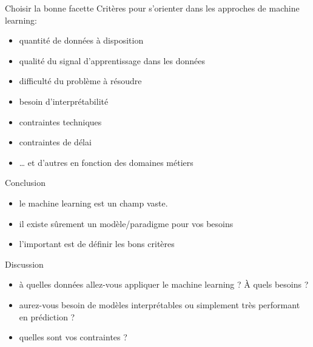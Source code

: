 \begin{frame}{Choisir la bonne facette}
  Critères pour s'orienter dans les approches de machine learning:
  \begin{itemize}[<+->]
  \item quantité de données à disposition
  \item qualité du signal d'apprentissage dans les données
  \item difficulté du problème à résoudre
  \item besoin d'interprétabilité
  \item contraintes techniques
  \item contraintes de délai
  \item … et d'autres en fonction des domaines métiers
  \end{itemize}
\end{frame}

\begin{frame}{Conclusion}
  \begin{itemize}
  \item le machine learning est un champ vaste.
  \item il existe sûrement un modèle/paradigme pour vos besoins
  \item l'important est de définir les bons critères
  \end{itemize}
\end{frame}

\begin{frame}{Discussion}
  \begin{itemize}
  \item à quelles données allez-vous appliquer le machine learning ? À
    quels besoins ?
  \item aurez-vous besoin de modèles interprétables ou simplement très
    performant en prédiction ?
  \item quelles sont vos contraintes ?
  \end{itemize}
\end{frame}

